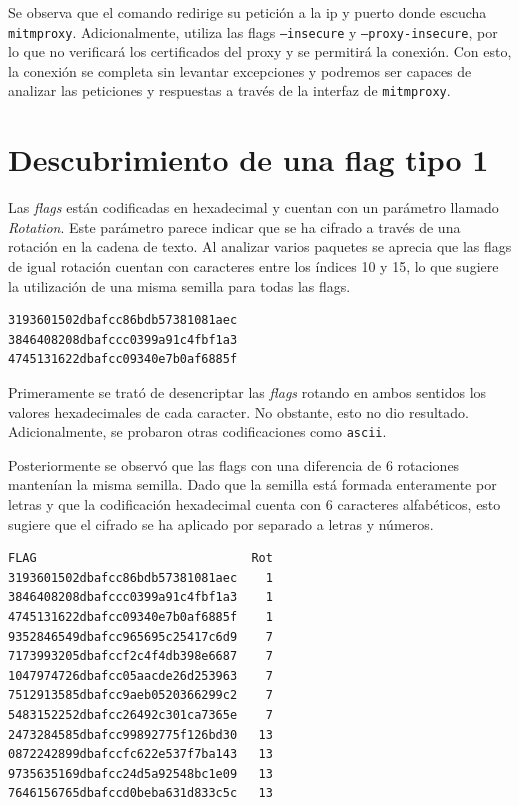 \documentclass[]{article}
\begin{document}
Se observa que el comando redirige su petición a la ip y puerto donde escucha
\texttt{mitmproxy}. Adicionalmente, utiliza las flags \texttt{--insecure} y
\texttt{--proxy-insecure}, por lo que no verificará los certificados del proxy
y se permitirá la conexión. Con esto, la conexión se completa sin levantar
excepciones y podremos ser capaces de analizar las peticiones y respuestas a
través de la interfaz de \texttt{mitmproxy}.

\section{Descubrimiento de una flag tipo 1}
\label{sec:tipo1}

Las \textit{flags} están codificadas en hexadecimal y cuentan con un parámetro
llamado \textit{Rotation}. Este parámetro parece indicar que se ha cifrado a
través de una rotación en la cadena de texto. Al analizar varios paquetes se
aprecia que las flags de igual rotación cuentan con caracteres entre los
índices 10 y 15, lo que sugiere la utilización de una misma semilla para todas
las flags.

\lstset{style=flag}
\begin{lstlisting}[language=flag, caption=Varias flags para rotation 1 donde la semilla es dbafcc]
3193601502dbafcc86bdb57381081aec
3846408208dbafccc0399a91c4fbf1a3
4745131622dbafcc09340e7b0af6885f
\end{lstlisting}

Primeramente se trató de desencriptar las \textit{flags} rotando en ambos sentidos los valores hexadecimales de cada caracter. No obstante, esto no dio resultado. Adicionalmente, se probaron otras codificaciones como \texttt{ascii}.

Posteriormente se observó que las flags con una diferencia de 6 rotaciones mantenían la misma semilla. Dado que la semilla está formada enteramente por letras y que la codificación hexadecimal cuenta con 6 caracteres alfabéticos, esto sugiere que el cifrado se ha aplicado por separado a letras y números.

\begin{lstlisting}[language=flag, escapechar=@, caption=Varias flag con la misma semilla y 6 rotaciones]
FLAG                              Rot
3193601502dbafcc86bdb57381081aec    1
3846408208dbafccc0399a91c4fbf1a3    1
4745131622dbafcc09340e7b0af6885f    1
9352846549dbafcc965695c25417c6d9    7
7173993205dbafccf2c4f4db398e6687    7
1047974726dbafcc05aacde26d253963    7
7512913585dbafcc9aeb0520366299c2    7
5483152252dbafcc26492c301ca7365e    7
2473284585dbafcc99892775f126bd30   13
0872242899dbafccfc622e537f7ba143   13
9735635169dbafcc24d5a92548bc1e09   13
7646156765dbafccd0beba631d833c5c   13
\end{lstlisting}
\end{document}
